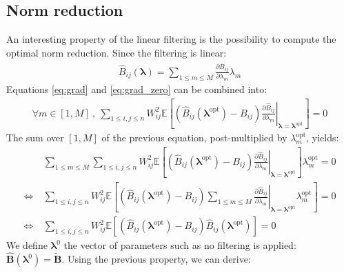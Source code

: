 \documentclass[12pt]{scrartcl}
\begin{document}
\subsection{Norm reduction}
An interesting property of the linear filtering is the possibility to compute the optimal norm reduction. Since the filtering is linear:
\begin{align}
\widehat{B}_{ij}\left(\boldsymbol{\lambda}\right) = \sum_{1 \le m \le M} \frac{\partial \widehat{B}_{ij}}{\partial \lambda_m} \lambda_m
\end{align}
Equations \eqref{eq:grad} and \eqref{eq:grad_zero} can be combined into:
\begin{align}
\forall m \in [1,M] \ , \ \sum_{1 \le i,j \le n} W_{ij}^2 \mathbb{E}\left[ \left(\widehat{B}_{ij}\left(\boldsymbol{\lambda}^\mathrm{opt}\right) - B_{ij} \right) \left.\frac{\partial \widehat{B}_{ij}}{\partial \lambda_m}\right|_{\boldsymbol{\lambda}=\boldsymbol{\lambda}^\mathrm{opt}} \right] = 0
\end{align}
The sum over $[1,M]$ of the previous equation, post-multiplied by $\lambda^\mathrm{opt}_m$, yields:
\begin{align}
\label{eq:filt_red}
& \sum_{1 \le m \le M} \sum_{1 \le i,j \le n} W_{ij}^2 \mathbb{E}\left[ \left(\widehat{B}_{ij}\left(\boldsymbol{\lambda}^\mathrm{opt}\right) - B_{ij} \right) \left.\frac{\partial \widehat{B}_{ij}}{\partial \lambda_m}\right|_{\boldsymbol{\lambda}=\boldsymbol{\lambda}^\mathrm{opt}} \right] \lambda^\mathrm{opt}_m = 0 \nonumber \\
\Leftrightarrow \ & \sum_{1 \le i,j \le n} W_{ij}^2 \mathbb{E}\left[ \left(\widehat{B}_{ij}\left(\boldsymbol{\lambda}^\mathrm{opt}\right) - B_{ij} \right) \sum_{1 \le m \le M} \left.\frac{\partial \widehat{B}_{ij}}{\partial \lambda_m}\right|_{\boldsymbol{\lambda}=\boldsymbol{\lambda}^\mathrm{opt}} \lambda^\mathrm{opt}_m \right] = 0 \nonumber \\
\Leftrightarrow \ & \sum_{1 \le i,j \le n} W_{ij}^2 \mathbb{E}\left[ \left(\widehat{B}_{ij}\left(\boldsymbol{\lambda}^\mathrm{opt}\right) - B_{ij} \right) \widehat{B}_{ij}\left(\boldsymbol{\lambda}^\mathrm{opt}\right) \right] = 0
\end{align}
We define $\boldsymbol{\lambda}^0$ the vector of parameters such as no filtering is applied: $\widehat{\mathbf{B}}\left(\boldsymbol{\lambda}^0\right) = \widetilde{\mathbf{B}}$. Using the previous property, we can derive:
\end{document}
